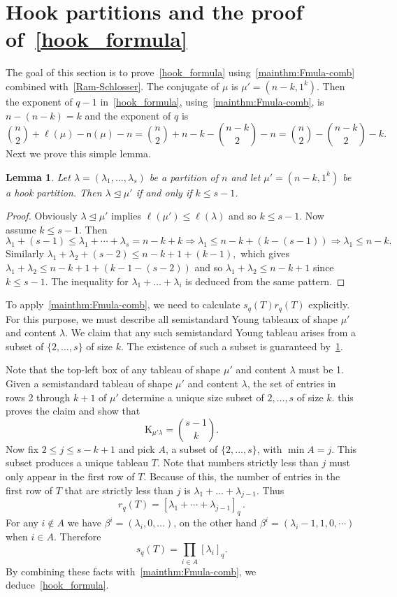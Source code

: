 \documentclass[12pt,a4paper,reqno]{amsart}
\theoremstyle{plain}
\newtheorem{lemma}[theorem]{Lemma}
\theoremstyle{definition}
\newcommand{\less}{\unlhd}
\newcommand{\1}{\mathds{1}}
\newcommand{\K}{{\mathrm{K}}}
\newcommand{\fn}{\mathsf{n}}
\begin{document}
\section{Hook partitions and the proof of~\cref{hook_formula}} 
The goal of this section is to prove~\cref{hook_formula} using~\cref{mainthm:Fmula-comb} combined with~\cref{Ram-Schlosser}. The conjugate of $\mu$ is $\mu'=(n-k,1^k)$. Then the exponent of $q-1$ in~\cref{hook_formula}, using~\cref{mainthm:Fmula-comb}, is $n-(n-k)=k$ and the exponent of $q$ is 
$$
\binom{n}{2}+\ell(\mu)-\fn(\mu)-n=\binom{n}{2}+n-k-\binom{n-k}{2}-n=\binom{n}{2}-\binom{n-k}{2}-k.
$$
Next we prove this simple lemma. 
\begin{lemma}\label{ks:ine} Let $\lambda=(\lambda_1,\dots,\lambda_s)$ be a partition of $n$ and let $\mu'=(n-k,1^k)$ be a hook partition. Then $\lambda\less\mu'$ if and only if $k\leq s-1$.
\end{lemma}
\begin{proof}
    Obviously $\lambda\less \mu'$ implies $\ell(\mu')\leq \ell(\lambda)$ and so $k\leq s-1$. Now assume $k\leq s-1$. Then 
    $$
    \lambda_1+(s-1)\leq \lambda_1+\cdots+\lambda_s=n-k+k\Rightarrow \lambda_1\leq n-k+(k-(s-1))\Rightarrow \lambda_1\leq n-k.
    $$
    Similarly 
    $
    \lambda_1+\lambda_2+(s-2)\leq n-k+1+(k-1),$
    which gives $ \lambda_1+\lambda_2\leq n-k+1+(k-1-(s-2))$ and so $\lambda_1+\lambda_2\leq n-k+1$ since $k\leq s-1$. The inequality for $\lambda_1+\dots+\lambda_i$ is deduced from the same pattern. 
\end{proof}
To apply~\cref{mainthm:Fmula-comb}, we need to calculate $s_q(T)r_q(T)$ explicitly. For this purpose, we must describe all semistandard Young tableaux of shape $\mu'$ and content $\lambda$. We claim that any such semistandard Young tableau arises from a subset of $\{2,\dots,s\}$ of size $k$. The existence of such a subset is guaranteed by~\cref{ks:ine}.

Note that the top-left box of any tableau of shape $\mu'$ and content $\lambda$ must be 1. Given a semistandard tableau of shape $\mu'$ and content $\lambda$, the set of entries in rows 2 through $k + 1$ of $\mu'$ determine a unique size subset of ${2,\ldots,s}$ of size $k$. this proves the claim and show that
$$
\K_{\mu'\lambda}=\binom{s-1}{k}.
$$
Now fix $2 \leq j \leq s - k + 1$ and pick $A$, a subset of $\{2, \dots, s\}$, with $\min A = j$. This subset produces a unique tableau $T$. Note that numbers strictly less than $j$ must only appear in the first row of $T$. Because of this, the number of entries in the first row of $T$ that are strictly less than $j$ is $\lambda_1 + \dots + \lambda_{j-1}$. Thus
$$
r_q(T)=[\lambda_1+\cdots+\lambda_{j-1}]_q\, .
$$
For any $i\not\in A$ we have $\beta^i=(\lambda_i,0,\dots)$, on the other hand $\beta^i=(\lambda_i-1,1,0,\cdots)$ when $i\in A$. Therefore 
$$
s_q(T)=\prod_{i\in A}[\lambda_i]_q. 
$$
By combining these facts with~\cref{mainthm:Fmula-comb}, we deduce~\cref{hook_formula}.
\end{document}
